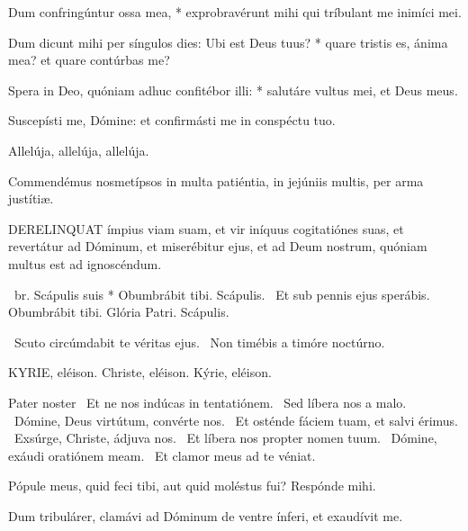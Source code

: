 Dum confringúntur ossa mea, * exprobravérunt mihi qui tríbulant me inimíci mei.

Dum dicunt mihi per síngulos dies: Ubi est Deus tuus? * quare tristis es, ánima mea? et quare contúrbas me?

Spera in Deo, quóniam adhuc confitébor illi: * salutáre vultus mei, et Deus meus.

  Suscepísti me, Dómine: et confirmásti me in conspéctu tuo.

  Allelúja, allelúja, allelúja.



 Commendémus nosmetípsos in multa patiéntia, in jejúniis multis, per arma justítiæ.


\lettrine[lines=2]{D}{ERELINQUAT} ímpius viam suam, et vir iníquus cogitatiónes suas, et revertátur ad Dóminum, et miserébitur ejus, et ad Deum nostrum, quóniam multus est ad ignoscéndum.

\R\ br. Scápulis suis * Obumbrábit tibi. Scápulis. \V\ Et sub pennis ejus sperábis. Obumbrábit tibi. Glória Patri. Scápulis.

\V\ Scuto circúmdabit te véritas ejus. \R\ Non timébis a timóre noctúrno.


KYRIE, eléison. Christe, eléison. Kýrie, eléison.

Pater noster  \V\ Et ne nos indúcas in tentatiónem. \R\ Sed líbera nos a malo. \V\ Dómine, Deus virtútum, convérte nos. \R\ Et osténde fáciem tuam, et salvi érimus. \V\ Exsúrge, Christe, ádjuva nos. \R\ Et líbera nos propter nomen tuum. \V\ Dómine, exáudi oratiónem meam. \R\ Et clamor meus ad te véniat.




 Pópule meus, quid feci tibi, aut quid moléstus fui? Respónde mihi.


 Dum tribulárer, clamávi ad Dóminum de ventre ínferi, et exaudívit me.

